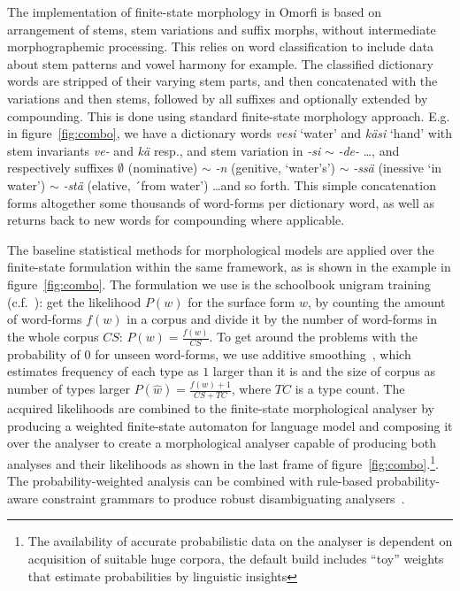 \documentclass[a4paper,12pt]{article}
\begin{document}
The implementation of finite-state morphology in Omorfi is based on
arrangement of stems, stem variations and suffix morphs, without
intermediate morphographemic processing. This relies on word classification
to include data about stem patterns and vowel harmony for example. The
classified dictionary words are stripped of their varying stem parts, and
then concatenated with the variations and then stems, followed by all
suffixes and optionally extended by compounding. This is done using standard
finite-state morphology approach. E.g.  in figure~\ref{fig:combo}, we have a
dictionary words \textit{vesi} `water' and \textit{käsi} `hand' with stem
invariants \textit{ve-} and \textit{kä} resp., and stem variation in
\textit{-si} $\sim$ \textit{-de-} \ldots, and respectively suffixes
$\emptyset$ (nominative) $\sim$ \textit{-n} (genitive, `water's') $\sim$
\textit{-ssä} (inessive `in water')  $\sim$ \textit{-stä} (elative, ´from
water') \ldots and so forth. This simple concatenation forms altogether
some thousands of word-forms per dictionary word, as well as returns back to
new words for compounding where applicable.

The baseline statistical methods for morphological models are applied over
the finite-state formulation within the same framework, as is shown in the
example in figure~\ref{fig:combo}.  The formulation we use is the schoolbook
unigram training (c.f.~\cite{manning1999foundations}): get the likelihood
$P(w)$ for the surface form $w$, by counting the amount of word-forms $f(w)$
in a corpus and divide it by the number of word-forms in the whole corpus
$CS$: $P(w) = \frac{f(w)}{CS}$.  To get around the problems with the
probability of $0$ for unseen word-forms, we use additive
smoothing~\citep{chen1999empirical}, which estimates frequency of each type
as $1$ larger than it is and the size of corpus as number of types larger
$P(\hat w) = \frac{f(w) + 1}{CS + TC}$, where $TC$ is a type count. The
acquired likelihoods are combined to the finite-state morphological analyser
by producing a weighted finite-state automaton for language model and
composing it over the analyser to create a morphological analyser capable of
producing both analyses and their likelihoods as shown in the last frame of
figure~\ref{fig:combo}.\footnote{The availability of accurate probabilistic
data on the analyser is dependent on acquisition of suitable huge corpora,
the default build includes ``toy'' weights that estimate probabilities by
linguistic insights}. The probability-weighted analysis can be combined with
rule-based probability-aware constraint grammars to produce robust
disambiguating analysers~\cite{pirinen2015using}.
\end{document}
